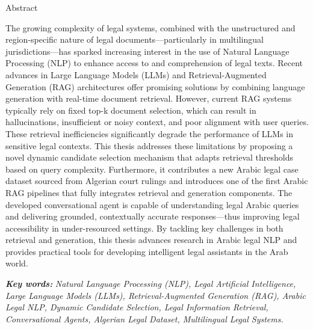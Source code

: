 \documentclass[12pt,a4paper]{report}
\begin{document}
	\begin{center} {\LARGE Abstract} \end{center}
	\par The growing complexity of legal systems, combined with the unstructured and region-specific nature of legal documents—particularly in multilingual jurisdictions—has sparked increasing interest in the use of Natural Language Processing (NLP) to enhance access to and comprehension of legal texts. Recent advances in Large Language Models (LLMs) and Retrieval-Augmented Generation (RAG) architectures offer promising solutions by combining language generation with real-time document retrieval. However, current RAG systems typically rely on fixed top-k document selection, which can result in hallucinations, insufficient or noisy context, and poor alignment with user queries. These retrieval inefficiencies significantly degrade the performance of LLMs in sensitive legal contexts.
	This thesis addresses these limitations by proposing a novel dynamic candidate selection mechanism that adapts retrieval thresholds based on query complexity. Furthermore, it contributes a new Arabic legal case dataset sourced from Algerian court rulings and introduces one of the first Arabic RAG pipelines that fully integrates retrieval and generation components. The developed conversational agent is capable of understanding legal Arabic queries and delivering grounded, contextually accurate responses—thus improving legal accessibility in under-resourced settings. By tackling key challenges in both retrieval and generation, this thesis advances research in Arabic legal NLP and provides practical tools for developing intelligent legal assistants in the Arab world.
	
	\textbf{\textit{Key words:}} \textit{Natural Language Processing (NLP), Legal Artificial Intelligence, Large Language Models (LLMs), Retrieval-Augmented Generation (RAG), Arabic Legal NLP, Dynamic Candidate Selection, Legal Information Retrieval, Conversational Agents, Algerian Legal Dataset, Multilingual Legal Systems.
	}
	
	\thispagestyle{empty}
\end{document}
